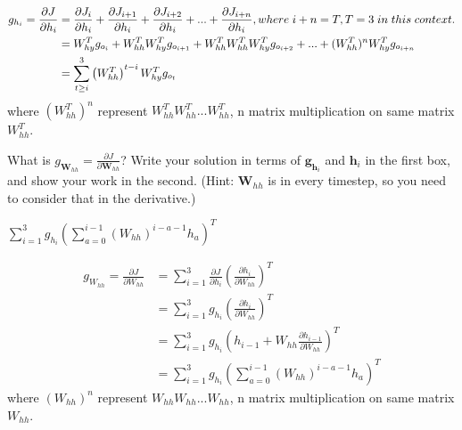\documentclass[11pt,addpoints,answers]{exam}
\newcommand{\gv}{\mathbf{g}}
\newcommand{\hv}{\mathbf{h}}
\newcommand{\Wv}{\mathbf{W}}
\begin{document}
\begin{questions}
\begin{parts}
\begin{subparts}
\begin{subsubparts}
\begin{your_solution}[title=Work,height=6cm,width=14cm]
    \[
    \begin{aligned}
    	g_{h_i} = \frac{\partial J}{\partial h_i} &=  \frac{\partial J_{i}}{\partial h_i} + \frac{\partial J_{i+1}}{\partial h_i} + \frac{\partial J_{i+2}}{\partial h_i} + ... +\frac{\partial J_{i+n}}{\partial h_i}, where \hspace{1mm} i+n = T, T=3 \hspace{1mm} in\hspace{1mm} this\hspace{1mm} context. \\
    	&= W_{hy}^Tg_{o_{i}} + W_{hh}^TW_{hy}^Tg_{o_{i+1}} + W_{hh}^TW_{hh}^TW_{hy}^Tg_{o_{i+2}} + ... + (W_{hh}^T)^nW_{hy}^Tg_{o_{i+n}} \\
    	&= \sum_{t \geq i}^{3} \left(W_{hh}^T\right)^{t-i} W_{hy}^T g_{o_t}
    \end{aligned}
    \]
    where $(W_{hh}^T)^n$ represent $W_{hh}^TW_{hh}^T...W_{hh}^T$, n matrix multiplication on same matrix $W_{hh}^T$.
    \end{your_solution}
    
    \subsubpart[3] What is $g_{\Wv_{hh}} = \frac{\partial J}{\partial \Wv_{hh}}$? Write your solution in terms of $\gv_{\hv_i}$ and $\hv_i$ in the first box, and show your work in the second. (Hint: $\Wv_{hh}$ is in every timestep, so you need to consider that in the derivative.)
    
    
    \begin{your_solution}[title=$\frac{\partial J}{\partial \Wv_{hh}}$,height=2.5cm,width=10.5cm]
    $\sum_{i=1}^{3} g_{h_i} \left( \sum_{a=0}^{i-1} (W_{hh})^{i-a-1}h_a \right)^T$
    \end{your_solution}
    
    \begin{your_solution}[title=Work,height=6.5cm,width=14cm]
       \small
    \[
	\begin{aligned}
		g_{W_{hh}} = \frac{\partial J}{\partial W_{hh}} &= \sum_{i=1}^{3} \frac{\partial J}{\partial h_i} \left( \frac{\partial 	h_i}{\partial W_{hh}} \right)^T \\
		&= \sum_{i=1}^{3} g_{h_i} \left( \frac{\partial h_i}{\partial W_{hh}} \right)^T \\
		&= \sum_{i=1}^{3} g_{h_i} \left( h_{i-1} + W_{hh}\frac{\partial h_{i-1}}{\partial W_{hh}}\right)^T \\
		&= \sum_{i=1}^{3} g_{h_i} \left( \sum_{a=0}^{i-1} (W_{hh})^{i-a-1}h_a \right)^T
	\end{aligned}
	\]        
	where $(W_{hh})^n$ represent $W_{hh}W_{hh}...W_{hh}$, n matrix multiplication on same matrix $W_{hh}$.
    \end{your_solution}\\
    \end{subsubparts}
    

\end{subparts}
\end{parts}
\end{questions}
\end{document}
